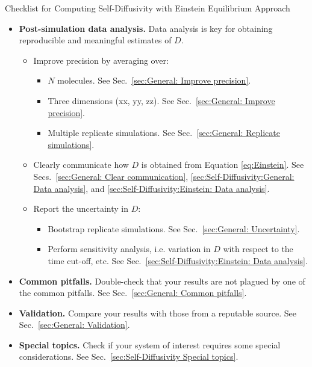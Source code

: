 \documentclass[9pt,bestpractices]{livecoms}
\begin{document}
\begin{Checklists*}[p!]
\begin{checklist}{Checklist for Computing Self-Diffusivity with Einstein Equilibrium Approach}
\begin{itemize}
			\item
			\textbf{Post-simulation data analysis.} Data analysis is key for obtaining reproducible and meaningful estimates of $D$.
			\begin{itemize}
				\item Improve precision by averaging over:
				\begin{itemize}
					\item $N$ molecules. See Sec.\ \ref{sec:General: Improve precision}.
					\item Three dimensions (xx, yy, zz). See Sec.\ \ref{sec:General: Improve precision}.
					\item Multiple replicate simulations. See Sec.\ \ref{sec:General: Replicate simulations}.
				\end{itemize}
				\item Clearly communicate how $D$ is obtained from Equation \ref{eq:Einstein}. See Secs.\ \ref{sec:General: Clear communication}, \ref{sec:Self-Diffusivity:General: Data analysis}, and \ref{sec:Self-Diffusivity:Einstein: Data analysis}.
				\item Report the uncertainty in $D$:
				\begin{itemize}
					\item Bootstrap replicate simulations. See Sec.\ \ref{sec:General: Uncertainty}.
					\item Perform sensitivity analysis, i.e. variation in $D$ with respect to the time cut-off, etc. See Sec.\ \ref{sec:Self-Diffusivity:Einstein: Data analysis}.
				\end{itemize}
			\end{itemize}
		    \vspace{-0.325\baselineskip} %

			\item
			\textbf{Common pitfalls.} Double-check that your results are not plagued by one of the common pitfalls. See Sec.\ \ref{sec:General: Common pitfalls}.
			
			\item
			\textbf{Validation.} Compare your results with those from a reputable source. See Sec.\ \ref{sec:General: Validation}.

			\item
			\textbf{Special topics.} Check if your system of interest requires some special considerations. See Sec.\ \ref{sec:Self-Diffusivity Special topics}.

		\end{itemize}
	\end{checklist}
\end{Checklists*}
\end{document}
